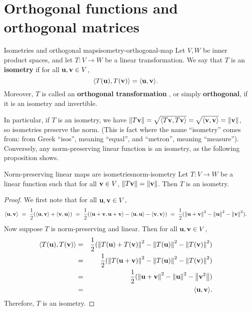 \section{Orthogonal functions and orthogonal matrices}

\begin{definition}{Isometries and orthogonal maps}{isometry-orthogonal-map}
  Let $V,W$ be inner product spaces, and let $T:V\to W$ be a linear
  transformation. We say that $T$ is an \textbf{isometry}%
   if for all
  $\vect{u},\vect{v}\in V$,
  \begin{equation*}
    \iprod{T(\vect{u}),T(\vect{v})} = \iprod{\vect{u},\vect{v}}.
  \end{equation*}
  Moreover, $T$ is called an \textbf{orthogonal transformation}%
  , or simply
  \textbf{orthogonal}, if it is an isometry and invertible.
\end{definition}

In particular, if $T$ is an isometry, we have
$\norm{T\vect{v}} = \sqrt{\iprod{T\vect{v},T\vect{v}}} =
\sqrt{\iprod{\vect{v},\vect{v}}} = \norm{\vect{v}}$, so isometries
preserve the norm. (This is fact where the name ``isometry'' comes
from: from Greek ``isos'', meaning ``equal'', and ``metron'', meaning
``measure''). Conversely, any norm-preserving linear function is an
isometry, as the following proposition shows.

\begin{proposition}{Norm-preserving linear maps are isometries}{norm-isometry}
  Let $T:V\to W$ be a linear function such that for all
  $\vect{v}\in V$, $\norm{T\vect{v}} = \norm{\vect{v}}$. Then $T$ is
  an isometry.
\end{proposition}

\begin{proof}
  We first note that for all $\vect{u},\vect{v}\in V$,
  \begin{equation*}
    \iprod{\vect{u},\vect{v}}
    ~=~ \frac{1}{2}(\iprod{\vect{u},\vect{v}} + \iprod{\vect{v},\vect{u}})
    ~=~ \frac{1}{2}(\iprod{\vect{u}+\vect{v},\vect{u}+\vect{v}}
    - \iprod{\vect{u},\vect{u}} - \iprod{\vect{v},\vect{v}})
    ~=~ \frac{1}{2}(\norm{\vect{u}+\vect{v}}^2
    - \norm{\vect{u}}^2 - \norm{\vect{v}}^2).
  \end{equation*}
  Now suppose $T$ is norm-preserving and linear. Then for all
  $\vect{u},\vect{v}\in V$,
  \begin{eqnarray*}
    \iprod{T(\vect{u}),T(\vect{v})}
    &=& \frac{1}{2}(\norm{T(\vect{u})+T(\vect{v})}^2 - \norm{T(\vect{u})}^2 -
        \norm{T(\vect{v})}^2) \\
    &=& \frac{1}{2}(\norm{T(\vect{u}+\vect{v})}^2 - \norm{T(\vect{u})}^2 -
        \norm{T(\vect{v})}^2) \\
    &=& \frac{1}{2}(\norm{\vect{u}+\vect{v}}^2 -
        \norm{\vect{u}}^2 - \norm{\vect{v}^2}) \\
    &=& \iprod{\vect{u},\vect{v}}.
  \end{eqnarray*}
  Therefore, $T$ is an isometry.
\end{proof}


